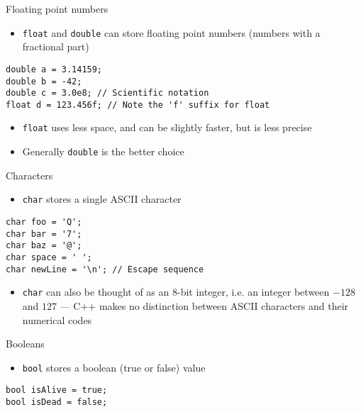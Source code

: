 \begin{frame}[fragile]{Floating point numbers}
	\begin{itemize}
		\item \lstinline{float} and \lstinline{double} can store floating point numbers (numbers with a fractional part)
	\end{itemize}
	\begin{lstlisting}
double a = 3.14159;
double b = -42;
double c = 3.0e8; // Scientific notation
float d = 123.456f; // Note the 'f' suffix for float
	\end{lstlisting}
	\pause
	\begin{itemize}
		\item \lstinline{float} uses less space, and can be slightly faster, but is less precise \pause
		\item Generally \lstinline{double} is the better choice
	\end{itemize}
\end{frame}

\begin{frame}[fragile]{Characters}
	\begin{itemize}
		\item \lstinline{char} stores a single ASCII character
	\end{itemize}
	\begin{lstlisting}
char foo = 'Q';
char bar = '7';
char baz = '@';
char space = ' ';
char newLine = '\n'; // Escape sequence
	\end{lstlisting}
	\pause
	\begin{itemize}
		\item \lstinline{char} can also be thought of as an 8-bit integer, i.e. an integer between $-128$ and $127$ ---
			C++ makes no distinction between ASCII characters and their numerical codes
	\end{itemize}
\end{frame}

\begin{frame}[fragile]{Booleans}
	\begin{itemize}
		\item \lstinline{bool} stores a boolean (true or false) value
	\end{itemize}
	\begin{lstlisting}
bool isAlive = true;
bool isDead = false;
	\end{lstlisting}
\end{frame}


